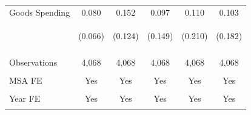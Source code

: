 \documentclass[dv_diss_main.tex]{subfiles}
\begin{document}
\begin{table}[H]
\begin{center}
{\begin{tabular}{lccccc}
    Goods Spending & 0.080 & 0.152 & 0.097 & 0.110 & 0.103 \\
     & \begin{footnotesize}(0.066)\end{footnotesize} & \begin{footnotesize}(0.124)\end{footnotesize} & \begin{footnotesize}(0.149)\end{footnotesize} & \begin{footnotesize}(0.210)\end{footnotesize} & \begin{footnotesize}(0.182)\end{footnotesize} \\

    \vspace{4pt} & \begin{footnotesize}\end{footnotesize} & \begin{footnotesize}\end{footnotesize} & \begin{footnotesize}\end{footnotesize} & \begin{footnotesize}\end{footnotesize} & \begin{footnotesize}\end{footnotesize} \\
    Observations & 4,068 & 4,068 & 4,068 & 4,068 & 4,068 \\
    \vspace{-2pt} & \vspace{-2pt} & \vspace{-2pt} & \vspace{-2pt} & \vspace{-2pt} \\
    MSA FE & Yes & Yes & Yes & Yes & Yes \\
    \vspace{-2pt} & \vspace{-2pt} & \vspace{-2pt} & \vspace{-2pt} & \vspace{-2pt} \\
    Year FE & Yes & Yes & Yes & Yes & Yes \\
    \vspace{-2pt} & \vspace{-2pt} & \vspace{-2pt} & \vspace{-2pt} & \vspace{-2pt} \\

\end{tabular}}
\end{center}
\end{table}
\end{document}
